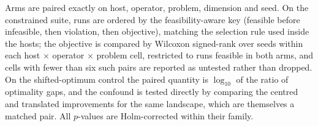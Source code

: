 Arms are paired exactly on host, operator, problem, dimension and seed. On the
constrained suite, runs are ordered by the feasibility-aware key (feasible before
infeasible, then violation, then objective), matching the selection rule used
inside the hosts; the objective is compared by Wilcoxon signed-rank over seeds
within each host $\times$ operator $\times$ problem cell, restricted to runs
feasible in both arms, and cells with fewer than six such pairs are reported as
untested rather than dropped. On the shifted-optimum control the paired quantity
is $\log_{10}$ of the ratio of optimality gaps, and the confound is tested
directly by comparing the centred and translated improvements for the same
landscape, which are themselves a matched pair. All $p$-values are Holm-corrected
within their family.
